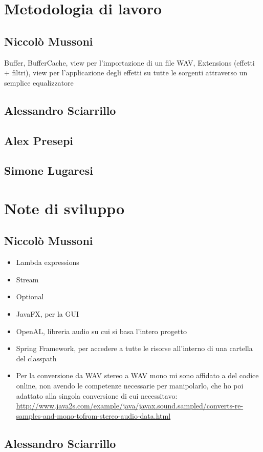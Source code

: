\documentclass[a4paper,12pt]{report}
\begin{document}
\section{Metodologia di lavoro}
\subsection*{Niccolò Mussoni}
Buffer, BufferCache, view per l’importazione di un file WAV, Extensions (effetti + filtri), view per l’applicazione degli effetti su tutte le sorgenti attraverso un semplice equalizzatore
\subsection*{Alessandro Sciarrillo}
\subsection*{Alex Presepi}
\subsection*{Simone Lugaresi}
\section{Note di sviluppo}
\subsection*{Niccolò Mussoni}
\begin{itemize}
	\item Lambda expressions
	\item Stream
	\item Optional
	\item JavaFX, per la GUI
	\item OpenAL, libreria audio su cui si basa l’intero progetto
	\item Spring Framework, per accedere a tutte le risorse all’interno di una cartella del classpath
	\item Per la conversione da WAV stereo a WAV mono mi sono affidato a del codice online, non avendo le competenze necessarie per manipolarlo, che ho poi adattato alla singola conversione di cui necessitavo: \url{http://www.java2s.com/example/java/javax.sound.sampled/converts-re-samples-and-mono-tofrom-stereo-audio-data.html}
\end{itemize}
\subsection*{Alessandro Sciarrillo}
\end{document}
